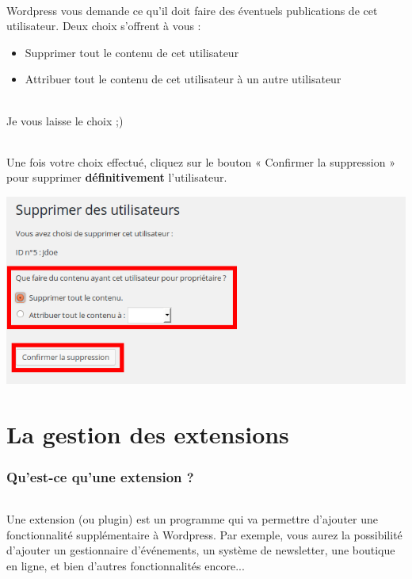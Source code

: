 \documentclass[10pt,a4paper]{article}
\begin{document}
\paragraph{}Wordpress vous demande ce qu'il doit faire des éventuels publications de cet utilisateur. Deux choix s'offrent à vous :
\begin{itemize}
\item Supprimer tout le contenu de cet utilisateur
\item Attribuer tout le contenu de cet utilisateur à un autre utilisateur
\end{itemize}
\paragraph{}Je vous laisse le choix ;)
\paragraph{}Une fois votre choix effectué, cliquez sur le bouton « Confirmer la suppression » pour supprimer \textbf{définitivement} l'utilisateur.
\begin{center}
\includegraphics[scale=0.3]{img/0162.png}
\end{center}
\newpage

\part{La gestion des extensions}
\newpage

\section{Qu'est-ce qu'une extension ?}
\paragraph{}Une extension (ou plugin) est un programme qui va permettre d'ajouter une fonctionnalité supplémentaire à Wordpress. Par exemple, vous aurez la possibilité d'ajouter un gestionnaire d'événements, un système de newsletter, une boutique en ligne, et bien d'autres fonctionnalités encore...
\end{document}
